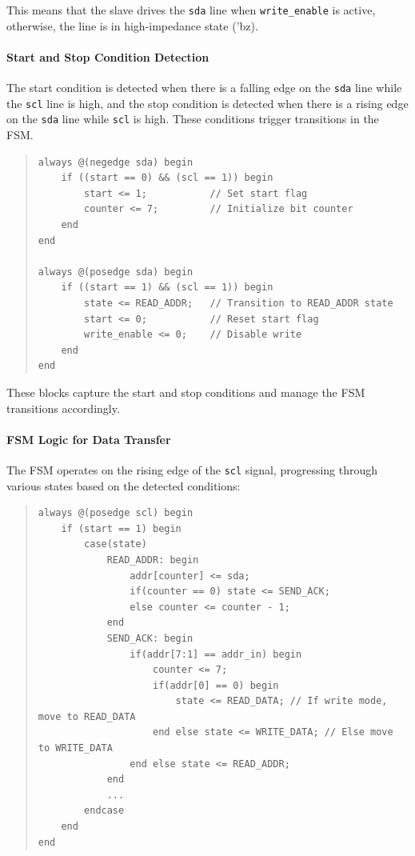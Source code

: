 \documentclass[a4paper,12pt]{report}
\begin{document}
This means that the slave drives the \texttt{sda} line when \texttt{write\_enable} is active, otherwise, the line is in high-impedance state ('bz).

\paragraph{Start and Stop Condition Detection}
The start condition is detected when there is a falling edge on the \texttt{sda} line while the \texttt{scl} line is high, and the stop condition is detected when there is a rising edge on the \texttt{sda} line while \texttt{scl} is high. These conditions trigger transitions in the FSM.

\begin{quote}
\begin{verbatim}
always @(negedge sda) begin
    if ((start == 0) && (scl == 1)) begin
        start <= 1;           // Set start flag
        counter <= 7;         // Initialize bit counter
    end
end

always @(posedge sda) begin
    if ((start == 1) && (scl == 1)) begin
        state <= READ_ADDR;   // Transition to READ_ADDR state
        start <= 0;           // Reset start flag
        write_enable <= 0;    // Disable write
    end
end
\end{verbatim}
\end{quote}

These blocks capture the start and stop conditions and manage the FSM transitions accordingly.

\paragraph{FSM Logic for Data Transfer}
The FSM operates on the rising edge of the \texttt{scl} signal, progressing through various states based on the detected conditions:

\begin{quote}
\begin{verbatim}
always @(posedge scl) begin
    if (start == 1) begin
        case(state)
            READ_ADDR: begin
                addr[counter] <= sda;
                if(counter == 0) state <= SEND_ACK;
                else counter <= counter - 1;
            end
            SEND_ACK: begin
                if(addr[7:1] == addr_in) begin
                    counter <= 7;
                    if(addr[0] == 0) begin 
                        state <= READ_DATA; // If write mode, move to READ_DATA
                    end else state <= WRITE_DATA; // Else move to WRITE_DATA
                end else state <= READ_ADDR;
            end
            ...
        endcase
    end
end
\end{verbatim}
\end{quote}
\end{document}
